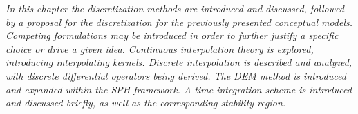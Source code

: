 
\label{cap:chapter-numerical}

\textit{In this chapter the discretization methods are introduced and discussed, followed by a proposal for the discretization for the previously presented conceptual models. Competing formulations may be introduced in order to further justify a specific choice or drive a given idea. Continuous interpolation theory is explored, introducing interpolating kernels. Discrete interpolation is described and analyzed, with discrete differential operators being derived. The \ac{DEM} method is introduced and expanded within the \ac{SPH} framework. A time integration scheme is introduced and discussed briefly, as well as the corresponding stability region.}





